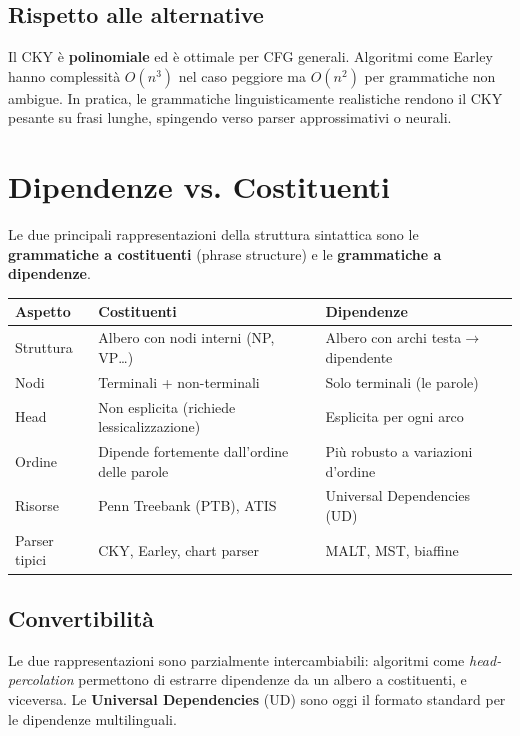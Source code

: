 \documentclass[12pt,a4paper]{article}
\begin{document}
\subsection{Rispetto alle alternative}
Il CKY è \textbf{polinomiale} ed è ottimale per CFG generali. Algoritmi come Earley hanno complessità $O(n^3)$ nel caso peggiore ma $O(n^2)$ per grammatiche non ambigue. In pratica, le grammatiche linguisticamente realistiche rendono il CKY pesante su frasi lunghe, spingendo verso parser approssimativi o neurali.

\section{Dipendenze vs. Costituenti}

Le due principali rappresentazioni della struttura sintattica sono le \textbf{grammatiche a costituenti} (phrase structure) e le \textbf{grammatiche a dipendenze}.

\begin{center}
\begin{tabular}{lll}
\toprule
\textbf{Aspetto} & \textbf{Costituenti} & \textbf{Dipendenze} \\
\midrule
Struttura & Albero con nodi interni (NP, VP\dots) & Albero con archi testa$\to$dipendente \\
Nodi & Terminali + non-terminali & Solo terminali (le parole) \\
Head & Non esplicita (richiede lessicalizzazione) & Esplicita per ogni arco \\
Ordine & Dipende fortemente dall'ordine delle parole & Più robusto a variazioni d'ordine \\
Risorse & Penn Treebank (PTB), ATIS & Universal Dependencies (UD) \\
Parser tipici & CKY, Earley, chart parser & MALT, MST, biaffine \\
\bottomrule
\end{tabular}
\end{center}

\subsection{Convertibilità}
Le due rappresentazioni sono parzialmente intercambiabili: algoritmi come \emph{head-percolation} permettono di estrarre dipendenze da un albero a costituenti, e viceversa. Le \textbf{Universal Dependencies} (UD) sono oggi il formato standard per le dipendenze multilinguali.
\end{document}
